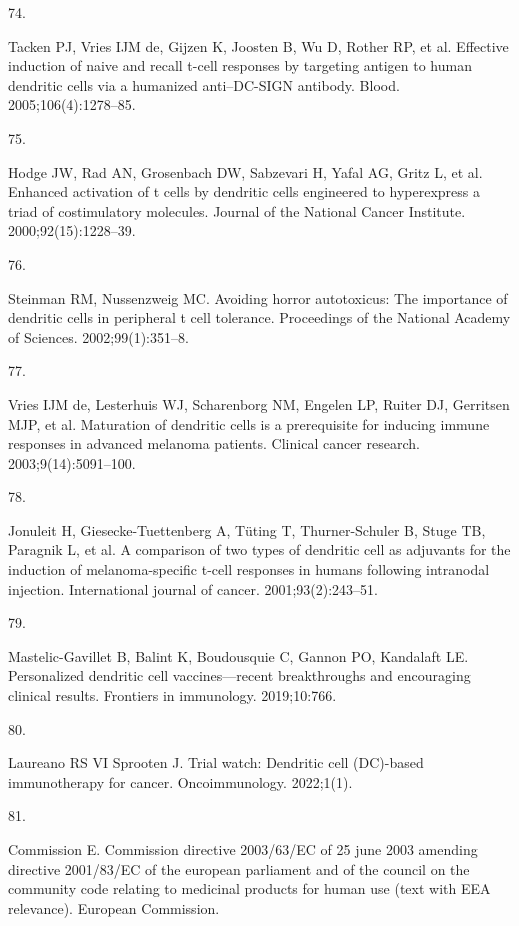 \documentclass[
]{article}
\newlength{\cslhangindent}
\newlength{\csllabelwidth}
\newenvironment{CSLReferences}[2] %
 {\begin{list}{}{%
  \setlength{\itemindent}{0pt}
  \setlength{\leftmargin}{0pt}
  \setlength{\parsep}{0pt}
  \ifodd #1
   \setlength{\leftmargin}{\cslhangindent}
   \setlength{\itemindent}{-1\cslhangindent}
  \fi
  \setlength{\itemsep}{#2\baselineskip}}}
 {\end{list}}
\newcommand{\CSLLeftMargin}[1]{\parbox[t]{\csllabelwidth}{\strut#1\strut}}
\newcommand{\CSLRightInline}[1]{\parbox[t]{\linewidth - \csllabelwidth}{\strut#1\strut}}
\begin{document}
\begin{CSLReferences}{0}{1}
\CSLLeftMargin{74. }%
\CSLRightInline{Tacken PJ, Vries IJM de, Gijzen K, Joosten B, Wu D,
Rother RP, et al. Effective induction of naive and recall t-cell
responses by targeting antigen to human dendritic cells via a humanized
anti--DC-SIGN antibody. Blood. 2005;106(4):1278--85. }

\CSLLeftMargin{75. }%
\CSLRightInline{Hodge JW, Rad AN, Grosenbach DW, Sabzevari H, Yafal AG,
Gritz L, et al. Enhanced activation of t cells by dendritic cells
engineered to hyperexpress a triad of costimulatory molecules. Journal
of the National Cancer Institute. 2000;92(15):1228--39. }

\CSLLeftMargin{76. }%
\CSLRightInline{Steinman RM, Nussenzweig MC. Avoiding horror
autotoxicus: The importance of dendritic cells in peripheral t cell
tolerance. Proceedings of the National Academy of Sciences.
2002;99(1):351--8. }

\CSLLeftMargin{77. }%
\CSLRightInline{Vries IJM de, Lesterhuis WJ, Scharenborg NM, Engelen LP,
Ruiter DJ, Gerritsen MJP, et al. Maturation of dendritic cells is a
prerequisite for inducing immune responses in advanced melanoma
patients. Clinical cancer research. 2003;9(14):5091--100. }

\CSLLeftMargin{78. }%
\CSLRightInline{Jonuleit H, Giesecke-Tuettenberg A, Tüting T,
Thurner-Schuler B, Stuge TB, Paragnik L, et al. A comparison of two
types of dendritic cell as adjuvants for the induction of
melanoma-specific t-cell responses in humans following intranodal
injection. International journal of cancer. 2001;93(2):243--51. }

\CSLLeftMargin{79. }%
\CSLRightInline{Mastelic-Gavillet B, Balint K, Boudousquie C, Gannon PO,
Kandalaft LE. Personalized dendritic cell vaccines---recent
breakthroughs and encouraging clinical results. Frontiers in immunology.
2019;10:766. }

\CSLLeftMargin{80. }%
\CSLRightInline{Laureano RS VI Sprooten J. Trial watch: Dendritic cell
(DC)-based immunotherapy for cancer. Oncoimmunology. 2022;1(1). }

\CSLLeftMargin{81. }%
\CSLRightInline{Commission E. Commission directive 2003/63/EC of 25 june
2003 amending directive 2001/83/EC of the european parliament and of the
council on the community code relating to medicinal products for human
use (text with EEA relevance). European Commission. }


\end{CSLReferences}
\end{document}
